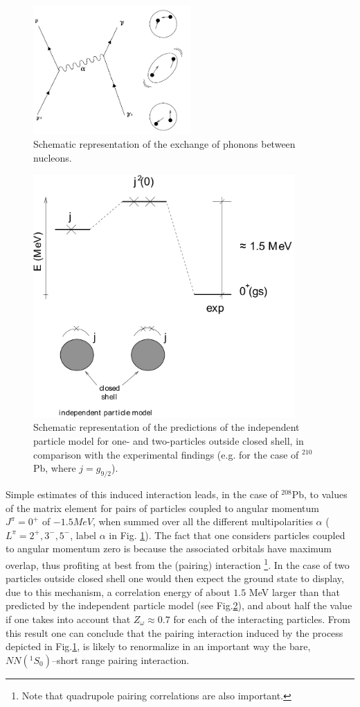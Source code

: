 \begin{figure}
\centerline {
\includegraphics*[width=6cm]{introduccion/figs/figintroD9}
}
\caption{Schematic representation of the exchange of phonons between nucleons.}
\label{fig:4.9}
\end{figure}
\begin{figure}
\centerline {
\includegraphics*[width=10cm]{introduccion/figs/figintroD10}
}
\caption{Schematic representation of the predictions of the independent particle model for one- and two-particles outside closed shell, in comparison with the experimental findings (e.g. for the case of $^{210}$Pb, where $j=g_{9/2}$).}
\label{fig:4.10}
\end{figure}
Simple estimates of this induced interaction leads, in the case of $^{208}$Pb, to values of the matrix element for pairs of particles coupled to angular momentum $J^{\pi} = 0^+$ of $-1.5 MeV$, when summed over all the different multipolarities $\alpha$ ($L^{\pi}=2^+,3^-,5^-$, label $\alpha$ in Fig. \ref{fig:4.9}). The fact that one considers particles coupled to angular momentum zero is because the associated orbitals have maximum overlap, thus profiting at best from the (pairing) interaction \footnote{Note that quadrupole pairing correlations are also important.}. In the case of two particles outside closed shell one would then expect the ground state to display, due to this mechanism, a correlation energy of about $1.5$ MeV larger than that predicted by the independent particle model (see Fig.\ref{fig:4.10}), and about half the value if one takes into account that $Z_\omega\approx0.7$ for each of the interacting particles. From this result one can conclude that the pairing interaction induced by the process depicted in Fig.\ref{fig:4.9}, is likely to renormalize in an important way the bare, $NN(^1S_0)$--short range pairing interaction.

